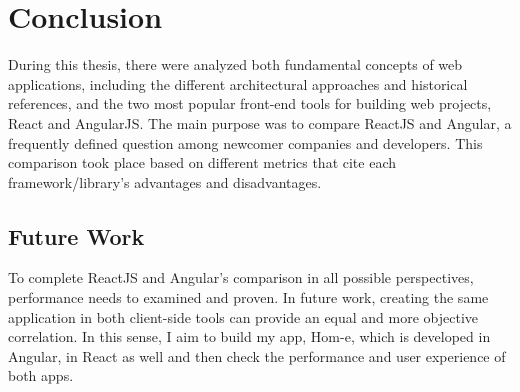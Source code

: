 
\chapter{Conclusion} %
\label{Chapter5} %

During this thesis, there were analyzed both fundamental concepts of web applications, including the different architectural approaches and historical references, and the two most popular front-end tools for building web projects, React and AngularJS. The main purpose was to compare ReactJS and Angular, a frequently defined question among newcomer companies and developers. This comparison took place based on different metrics that cite each framework/library's advantages and disadvantages.

\section{Future Work}
To complete ReactJS and Angular's comparison in all possible perspectives, performance needs to examined and proven. In future work, creating the same application in both client-side tools can provide an equal and more objective correlation. In this sense, I aim to build my app, Hom-e, which is developed in Angular, in React as well and then check the performance and user experience of both apps.
